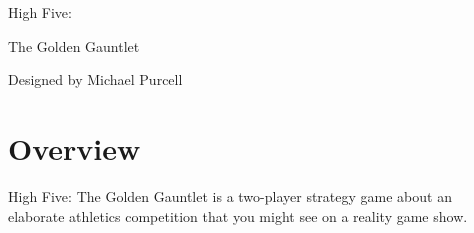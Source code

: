 \documentclass[a6paper, 11pt, parskip=half, DIV=15]{scrartcl}
\begin{document}
\begin{titlepage}
\pagecolor{white}
\AddToShipoutPictureBG{
}

\enlargethispage{3\baselineskip}
\setmainfont[Scale=1.5]{Graduate}
\Huge
\begin{center}
High Five:

\medskip

\normalsize
The Golden Gauntlet

\vfill


\vfill

\setmainfont[Scale=1.5]{Playball}
\large Designed by Michael Purcell
\end{center}
\end{titlepage}
\pagecolor{white}

\setmainfont{Tex Gyre Schola}
\ClearShipoutPicture
\enlargethispage{1.75\baselineskip}

%

\section*{Overview}
High Five: The Golden Gauntlet is a two-player strategy game about an elaborate athletics competition that you might see on a reality game show.
\end{document}
